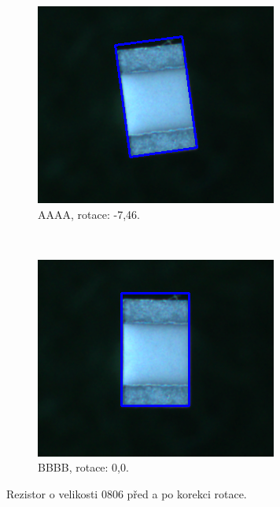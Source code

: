 \begin{figure}[h!]
	\centering
	\begin{subfigure}[b]{0.48\linewidth}
		\centering
		\includegraphics[width=1\linewidth]{obrazky/rot_before2.png}%
		\caption{AAAA, rotace: -7,46\textdegree.}
		\label{fig:rotBefore}
	\end{subfigure}
	~
	\begin{subfigure}[b]{0.48\linewidth}
		\centering
		\includegraphics[width=1\linewidth]{obrazky/rot_after2.png}%
		\caption{BBBB, rotace: 0,0\textdegree.}
		\label{fig:rotAfter}
	\end{subfigure}

	\caption{Rezistor o velikosti 0806 před a po korekci rotace.}
\end{figure}




















